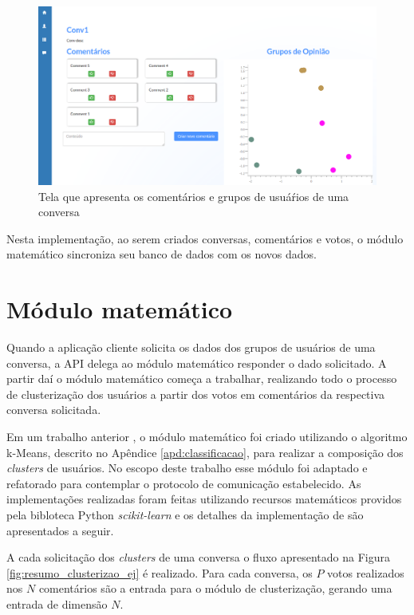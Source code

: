     \begin{figure}[h!]
      \centering
      \includegraphics[scale=0.48]{figuras/client.png}
      \caption{Tela que apresenta os comentários e grupos de usuáŕios de uma conversa}
      \label{fig:cliente}
    \end{figure}
  
    Nesta implementação, ao serem criados conversas, comentários e votos, o módulo matemático
    sincroniza seu banco de dados com os novos dados.
     
  \section{Módulo matemático}
     
    Quando a aplicação cliente solicita os dados dos grupos de usuários de uma conversa,
    a API delega ao módulo matemático responder o dado solicitado. A partir daí o módulo
    matemático começa a trabalhar, realizando todo o processo de clusterização dos usuários
    a partir dos votos em comentários da respectiva conversa solicitada.
    
    Em um trabalho anterior \cite{tallys_tcc}, o módulo matemático foi criado utilizando o algoritmo k-Means, descrito no Apêndice \ref{apd:classificacao},
    para realizar a composição dos \textit{clusters} de usuários. No escopo deste trabalho esse módulo foi adaptado e refatorado para contemplar
    o protocolo de comunicação estabelecido.
    As implementações realizadas foram feitas utilizando recursos matemáticos
    providos pela bibloteca Python \textit{scikit-learn}\footnotemark 
    e os detalhes da implementação de  são apresentados a seguir.
    
    
    A cada solicitação dos \textit{clusters} de uma conversa
    o fluxo apresentado na Figura \ref{fig:resumo_clusterizao_ej} é realizado.
    Para cada conversa, os $P$ votos realizados nos $N$ comentários são a entrada para o módulo de clusterização, 
    gerando uma entrada de dimensão $N$. 
    
